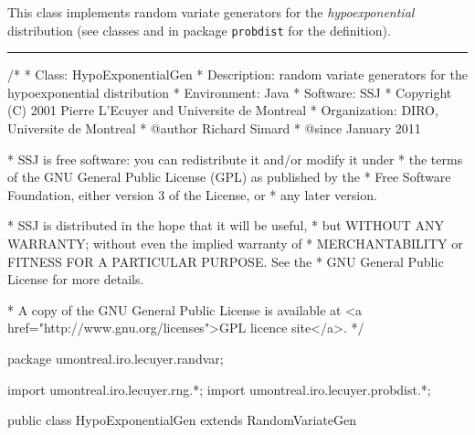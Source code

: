 
This class implements random variate generators for the 
\emph{hypoexponential} distribution (see classes 
 and
in package \texttt{probdist} for the definition).

\bigskip\hrule

\begin{code}
\begin{hide}
/*
 * Class:        HypoExponentialGen
 * Description:  random variate generators for the hypoexponential distribution 
 * Environment:  Java
 * Software:     SSJ 
 * Copyright (C) 2001  Pierre L'Ecuyer and Universite de Montreal
 * Organization: DIRO, Universite de Montreal
 * @author       Richard Simard
 * @since        January 2011

 * SSJ is free software: you can redistribute it and/or modify it under
 * the terms of the GNU General Public License (GPL) as published by the
 * Free Software Foundation, either version 3 of the License, or
 * any later version.

 * SSJ is distributed in the hope that it will be useful,
 * but WITHOUT ANY WARRANTY; without even the implied warranty of
 * MERCHANTABILITY or FITNESS FOR A PARTICULAR PURPOSE.  See the
 * GNU General Public License for more details.

 * A copy of the GNU General Public License is available at
   <a href="http://www.gnu.org/licenses">GPL licence site</a>.
 */
\end{hide}
package umontreal.iro.lecuyer.randvar;\begin{hide}
import umontreal.iro.lecuyer.rng.*;
import umontreal.iro.lecuyer.probdist.*;
\end{hide}

public class HypoExponentialGen extends RandomVariateGen \begin{hide} {
\end{hide}\end{code}

